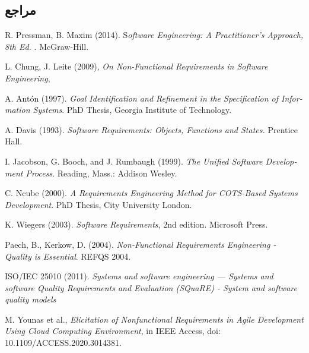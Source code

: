 {\begin{enumerate}[a)]
\begin{center}
\end{center}
\end{enumerate}
	

\subsection*{مراجع}

\begin{latin}
	\begingroup
	\renewcommand{\section}[2]{}%
	
\begin{thebibliography}{9}

	R. Pressman,   B. Maxim (2014).
	S\textit{oftware Engineering: A Practitioner’s Approach, 8th Ed. }.
	McGraw-Hill.

	
	
	L. Chung,  J. Leite (2009),
	\textit{On Non-Functional Requirements in Software Engineering},
	
	
	A. Antón (1997).
	\textit{Goal Identification and Refinement in
	the Specification of Information Systems}. PhD Thesis,
	Georgia Institute of Technology.
	
	A. Davis (1993). \textit{Software Requirements: Objects, Functions
	and States.} Prentice Hall.

	I. Jacobson, G. Booch, and J. Rumbaugh (1999). \textit{The
	Unified Software Development Process}. Reading,
	Mass.: Addison Wesley.
	
	C. Ncube (2000). \textit{A Requirements Engineering Method
	for COTS-Based Systems Development}. PhD Thesis,
	City University London.
	
	
	K. Wiegers (2003). \textit{Software Requirements}, 2nd edition.
	Microsoft Press.
	
	Paech, B., Kerkow, D. (2004). \textit{Non-Functional Requirements Engineering - Quality is Essential}.
	REFQS 2004.


	ISO/IEC 25010 (2011).\textit{ Systems and software engineering — Systems and software Quality Requirements and Evaluation (SQuaRE) - System and software quality models}
	
	M. Younas et al., \textit{Elicitation of Nonfunctional Requirements in Agile Development Using Cloud Computing Environment}, in IEEE Access, doi: 10.1109/ACCESS.2020.3014381.
	

\end{thebibliography}
\end{latin}}
